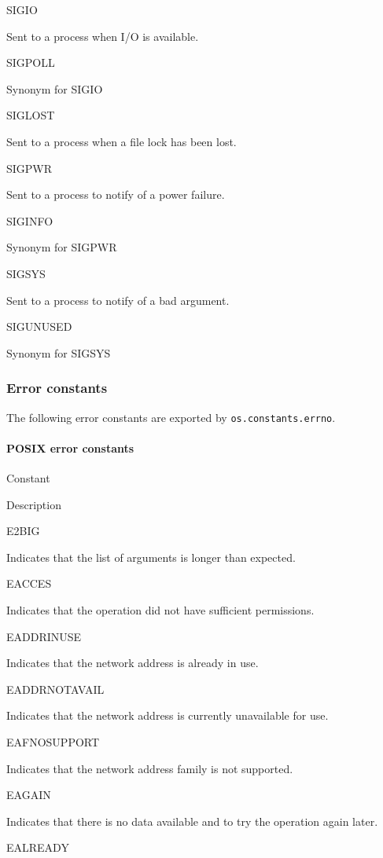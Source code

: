 SIGIO

Sent to a process when I/O is available.

SIGPOLL

Synonym for SIGIO

SIGLOST

Sent to a process when a file lock has been lost.

SIGPWR

Sent to a process to notify of a power failure.

SIGINFO

Synonym for SIGPWR

SIGSYS

Sent to a process to notify of a bad argument.

SIGUNUSED

Synonym for SIGSYS

\subsubsection{Error constants}\label{error-constants}

The following error constants are exported by
\texttt{os.constants.errno}.

\paragraph{POSIX error constants}\label{posix-error-constants}

Constant

Description

E2BIG

Indicates that the list of arguments is longer than expected.

EACCES

Indicates that the operation did not have sufficient permissions.

EADDRINUSE

Indicates that the network address is already in use.

EADDRNOTAVAIL

Indicates that the network address is currently unavailable for use.

EAFNOSUPPORT

Indicates that the network address family is not supported.

EAGAIN

Indicates that there is no data available and to try the operation again
later.

EALREADY

